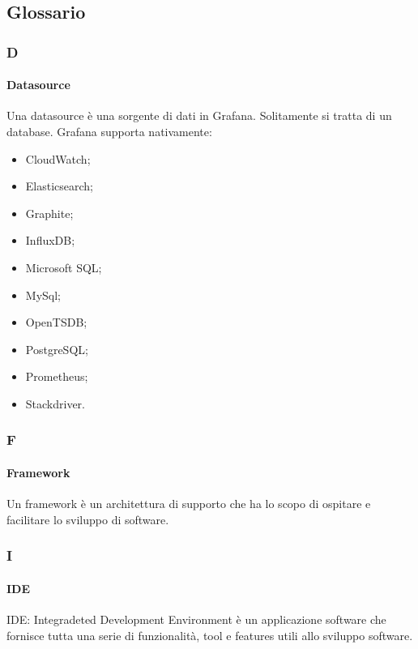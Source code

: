 \subsection{Glossario}
\subsubsection{D}

\paragraph{Datasource} \Spazio
\label{sec:datasource} 
Una datasource è una sorgente di dati in Grafana. Solitamente si tratta di un database. Grafana supporta nativamente:
	\begin{itemize}
	\item CloudWatch;
	\item Elasticsearch;
	\item Graphite;
	\item InfluxDB;
	\item Microsoft SQL;
	\item MySql;
	\item OpenTSDB;
	\item PostgreSQL;
	\item Prometheus;
	\item Stackdriver.
	\end{itemize}


\subsubsection{F}

	\paragraph{Framework} \Spazio
	\label{sec:ide}
Un framework è un architettura di supporto che ha lo scopo di ospitare e facilitare lo sviluppo di software.


\subsubsection{I}

	\paragraph{IDE} \Spazio
	\label{sec:ide}
IDE: Integradeted Development Environment è un applicazione software che fornisce tutta una serie di funzionalità, tool e features utili allo sviluppo software.

